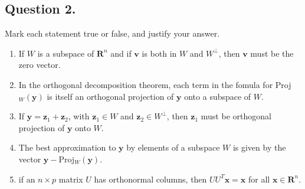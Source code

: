\documentclass{article}
\begin{document}
\subsection*{Question 2.}
Mark each statement true or false, and justify your answer.
\begin{enumerate} [label=(\arabic*)]
    \item If $W$ is a subspace of $\mathbf{R}^n$ and if $\mathbf{v}$ is both in $W$ and $W^\perp$, then $\mathbf{v}$ must be the zero vector.
    \item In the orthogonal decomposition theorem, each term in the fomula for Proj$_W(\mathbf{y})$ is itself an orthogonal projection of $\mathbf{y}$ onto a subspace of $W$.
    \item If $\mathbf{y}=\mathbf{z}_1+\mathbf{z}_2$, with $\mathbf{z}_1\in  W$ and $\mathbf{z}_2\in W^\perp$, then $\mathbf{z}_1$ must be orthogonal projection of $\mathbf{y}$ onto $W$.
    \item The best approximation to $\mathbf{y}$ by elements of a subspace $W$ is given by the vector $\mathbf{y}-$Proj$_W(\mathbf{y})$.
    \item if an $n\times p$ matrix $U$ has orthonormal columns, then $UU^T\mathbf{x}=\mathbf{x}$ for all $\mathbf{x}\in\mathbf{R}^n$.
\end{enumerate}
\end{document}
